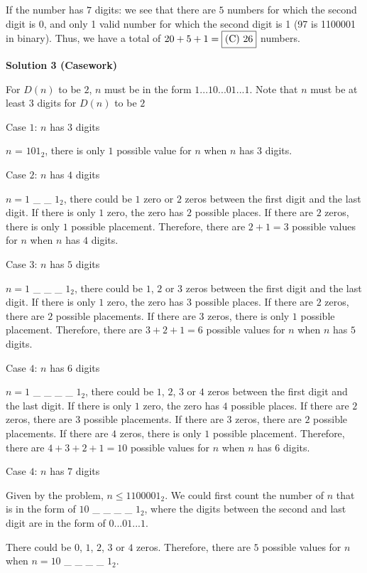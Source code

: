 \begin{enumerate}
 If the number has $7$ digits: we see that there are $5$ numbers for which the second digit is 0, and only 1 valid number for which the second digit is 1 (97 is 1100001 in binary). Thus, we have a total of $20+5+1=\fbox{(C) 26}$ numbers.

 



\textbf{Solution 3 (Casework)}

For $D(n)$ to be $2$, $n$ must be in the form $1...10...01...1$. Note that $n$ must be at least $3$ digits for $D(n)$ to be $2$

 Case $1$: $n$ has $3$ digits

 $n$ = $101_2$, there is only $1$ possible value for $n$ when $n$ has $3$ digits.

 
Case $2$: $n$ has $4$ digits

 $n = 1$ \_ \_ $1_2$, there could be $1$ zero or $2$ zeros between the first digit and the last digit. If there is only $1$ zero, the zero has $2$ possible places. If there are $2$ zeros, there is only $1$ possible placement. Therefore, there are $2+1=3$ possible values for $n$ when $n$ has $4$ digits.

 
Case $3$: $n$ has $5$ digits

 $n = 1$ \_ \_ \_ $1_2$, there could be $1$, $2$ or $3$ zeros between the first digit and the last digit. If there is only $1$ zero, the zero has $3$ possible places. If there are $2$ zeros, there are $2$ possible placements. If there are $3$ zeros, there is only $1$ possible placement. Therefore, there are $3+2+1=6$ possible values for $n$ when $n$ has $5$ digits.

 
Case $4$: $n$ has $6$ digits

 $n = 1$ \_ \_ \_ \_ $1_2$, there could be $1$, $2$, $3$ or $4$ zeros between the first digit and the last digit. If there is only $1$ zero, the zero has $4$ possible places. If there are $2$ zeros, there are $3$ possible placements. If there are $3$ zeros, there are $2$ possible placements. If there are $4$ zeros, there is only $1$ possible placement. Therefore, there are $4+3+2+1=10$ possible values for $n$ when $n$ has $6$ digits.

 
Case $4$: $n$ has $7$ digits

 Given by the problem, $n \le 1100001_2$. We could first count the number of $n$ that is in the form of $10$ \_ \_ \_ \_ $1_2$, where the digits between the second and last digit are in the form of $0...01...1$. 

 There could be $0$, $1$, $2$, $3$ or $4$ zeros. Therefore, there are $5$ possible values for $n$ when $n=10$ \_ \_ \_ \_ $1_2$.


\end{enumerate}
